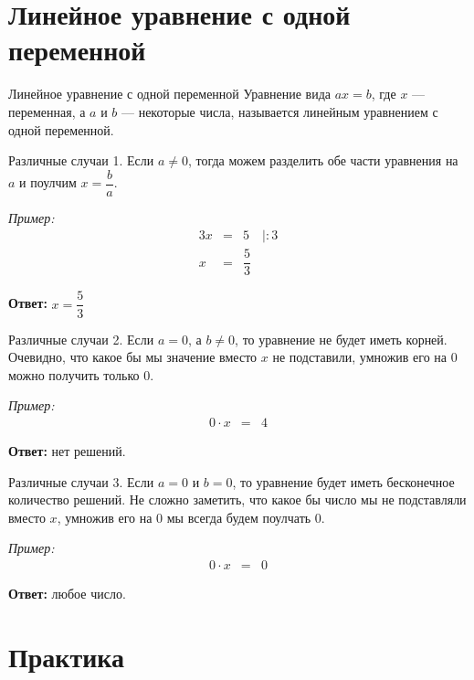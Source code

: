 \documentclass[12pt, aspectratio=169]{beamer}
\begin{document}
\section{Линейное уравнение с одной переменной}

\begin{frame}{Линейное уравнение с одной переменной}
	Уравнение вида $ax=b$, где $x$ — переменная, а $a$ и $b$ — некоторые числа, называется линейным уравнением с одной переменной.
\end{frame}

\begin{frame}{Различные случаи}
		1. Если $a\ne0$, тогда можем разделить обе части уравнения на $a$ и поулчим $x=\dfrac{b}{a}$.
		
		\textit{Пример:}
		\begin{eqnarray*}
			3x &=& 5 \quad |:3 \\
			x &=& \dfrac{5}{3}
		\end{eqnarray*}
	
		\textbf{Ответ:} $x=\dfrac{5}{3}$
\end{frame}

\begin{frame}{Различные случаи}
	2. Если $a=0$, а $b\ne0$, то уравнение не будет иметь корней. Очевидно, что какое бы мы значение вместо $x$ не подставили, умножив его на $0$ можно получить только $0$.
	
	\textit{Пример:}
	\begin{eqnarray*}
		0\cdot x &=& 4
	\end{eqnarray*}
	
	\textbf{Ответ:} нет решений.
\end{frame}

\begin{frame}{Различные случаи}
	3. Если $a=0$ и $b=0$, то уравнение будет иметь бесконечное количество решений. Не сложно заметить, что какое бы число мы не подставляли вместо $x$, умножив его на $0$ мы всегда будем поулчать $0$.
	
	\textit{Пример:}
	\begin{eqnarray*}
		0\cdot x &=& 0
	\end{eqnarray*}
	
	\textbf{Ответ:} любое число.
\end{frame}

\section{Практика}
\end{document}
